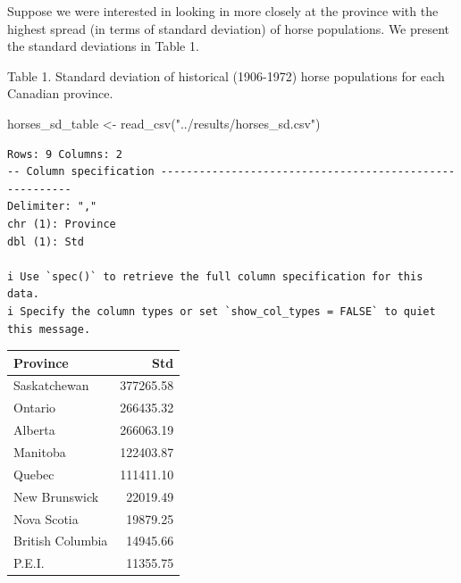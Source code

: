 \documentclass[
  letterpaper,
  DIV=11,
  numbers=noendperiod]{scrartcl}
\newenvironment{Shaded}{\begin{snugshade}}{\end{snugshade}}
\newcommand{\DecValTok}[1]{\textcolor[rgb]{0.68,0.00,0.00}{#1}}
\newcommand{\FunctionTok}[1]{\textcolor[rgb]{0.28,0.35,0.67}{#1}}
\newcommand{\NormalTok}[1]{\textcolor[rgb]{0.00,0.23,0.31}{#1}}
\newcommand{\OtherTok}[1]{\textcolor[rgb]{0.00,0.23,0.31}{#1}}
\newcommand{\SpecialCharTok}[1]{\textcolor[rgb]{0.37,0.37,0.37}{#1}}
\newcommand{\StringTok}[1]{\textcolor[rgb]{0.13,0.47,0.30}{#1}}
\begin{document}
Suppose we were interested in looking in more closely at the province
with the highest spread (in terms of standard deviation) of horse
populations. We present the standard deviations in Table 1.

Table 1. Standard deviation of historical (1906-1972) horse populations
for each Canadian province.

\begin{Shaded}
\begin{Highlighting}[]
\NormalTok{horses\_sd\_table }\OtherTok{\textless{}{-}} \FunctionTok{read\_csv}\NormalTok{(}\StringTok{"../results/horses\_sd.csv"}\NormalTok{)}
\end{Highlighting}
\end{Shaded}

\begin{verbatim}
Rows: 9 Columns: 2
-- Column specification --------------------------------------------------------
Delimiter: ","
chr (1): Province
dbl (1): Std

i Use `spec()` to retrieve the full column specification for this data.
i Specify the column types or set `show_col_types = FALSE` to quiet this message.
\end{verbatim}

\begin{Shaded}
\end{Shaded}

\begin{longtable}[]{@{}lr@{}}
\toprule\noalign{}
Province & Std \\
\midrule\noalign{}
\endhead
\bottomrule\noalign{}
\endlastfoot
Saskatchewan & 377265.58 \\
Ontario & 266435.32 \\
Alberta & 266063.19 \\
Manitoba & 122403.87 \\
Quebec & 111411.10 \\
New Brunswick & 22019.49 \\
Nova Scotia & 19879.25 \\
British Columbia & 14945.66 \\
P.E.I. & 11355.75 \\
\end{longtable}
\end{document}
